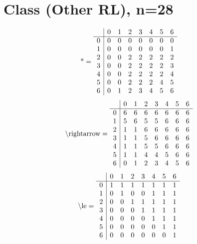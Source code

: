 \documentclass[11pt]{article}
\begin{document}
\section{Class (Other RL), n=28}
\[\text{*} = 
\begin{array}{r | r r r r r r r}
 & 0 & 1 & 2 & 3 & 4 & 5 & 6 \\ \hline
0 & 0 & 0 & 0 & 0 & 0 & 0 & 0 \\
1 & 0 & 0 & 0 & 0 & 0 & 0 & 1 \\
2 & 0 & 0 & 2 & 2 & 2 & 2 & 2 \\
3 & 0 & 0 & 2 & 2 & 2 & 2 & 3 \\
4 & 0 & 0 & 2 & 2 & 2 & 2 & 4 \\
5 & 0 & 0 & 2 & 2 & 2 & 4 & 5 \\
6 & 0 & 1 & 2 & 3 & 4 & 5 & 6 \\
\end{array}
\]
\[\text{\textbackslash rightarrow} = 
\begin{array}{r | r r r r r r r}
 & 0 & 1 & 2 & 3 & 4 & 5 & 6 \\ \hline
0 & 6 & 6 & 6 & 6 & 6 & 6 & 6 \\
1 & 5 & 6 & 5 & 5 & 6 & 6 & 6 \\
2 & 1 & 1 & 6 & 6 & 6 & 6 & 6 \\
3 & 1 & 1 & 5 & 6 & 6 & 6 & 6 \\
4 & 1 & 1 & 5 & 5 & 6 & 6 & 6 \\
5 & 1 & 1 & 4 & 4 & 5 & 6 & 6 \\
6 & 0 & 1 & 2 & 3 & 4 & 5 & 6 \\
\end{array}
\]
\[\text{\textbackslash le} = 
\begin{array}{r | r r r r r r r}
 & 0 & 1 & 2 & 3 & 4 & 5 & 6 \\ \hline
0 & 1 & 1 & 1 & 1 & 1 & 1 & 1 \\
1 & 0 & 1 & 0 & 0 & 1 & 1 & 1 \\
2 & 0 & 0 & 1 & 1 & 1 & 1 & 1 \\
3 & 0 & 0 & 0 & 1 & 1 & 1 & 1 \\
4 & 0 & 0 & 0 & 0 & 1 & 1 & 1 \\
5 & 0 & 0 & 0 & 0 & 0 & 1 & 1 \\
6 & 0 & 0 & 0 & 0 & 0 & 0 & 1 \\
\end{array}
\]
\end{document}
